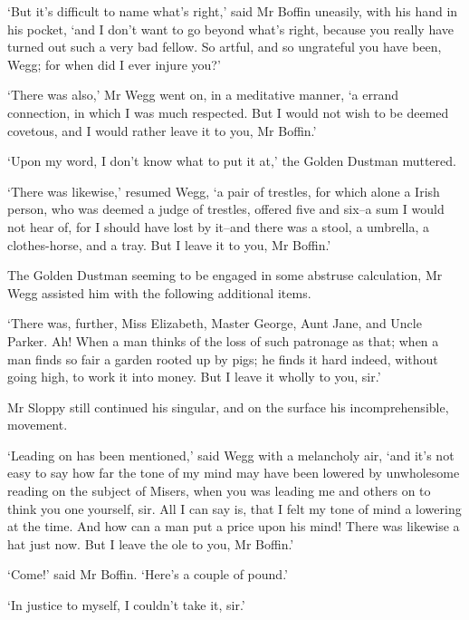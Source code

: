 ‘But it’s difficult to name what’s right,’ said Mr Boffin uneasily, with
his hand in his pocket, ‘and I don’t want to go beyond what’s right,
because you really have turned out such a very bad fellow. So artful,
and so ungrateful you have been, Wegg; for when did I ever injure you?’

‘There was also,’ Mr Wegg went on, in a meditative manner, ‘a errand
connection, in which I was much respected. But I would not wish to be
deemed covetous, and I would rather leave it to you, Mr Boffin.’

‘Upon my word, I don’t know what to put it at,’ the Golden Dustman
muttered.

‘There was likewise,’ resumed Wegg, ‘a pair of trestles, for which alone
a Irish person, who was deemed a judge of trestles, offered five and
six--a sum I would not hear of, for I should have lost by it--and there
was a stool, a umbrella, a clothes-horse, and a tray. But I leave it to
you, Mr Boffin.’

The Golden Dustman seeming to be engaged in some abstruse calculation,
Mr Wegg assisted him with the following additional items.

‘There was, further, Miss Elizabeth, Master George, Aunt Jane, and Uncle
Parker. Ah! When a man thinks of the loss of such patronage as that;
when a man finds so fair a garden rooted up by pigs; he finds it hard
indeed, without going high, to work it into money. But I leave it wholly
to you, sir.’

Mr Sloppy still continued his singular, and on the surface his
incomprehensible, movement.

‘Leading on has been mentioned,’ said Wegg with a melancholy air, ‘and
it’s not easy to say how far the tone of my mind may have been lowered
by unwholesome reading on the subject of Misers, when you was leading me
and others on to think you one yourself, sir. All I can say is, that
I felt my tone of mind a lowering at the time. And how can a man put a
price upon his mind! There was likewise a hat just now. But I leave the
ole to you, Mr Boffin.’

‘Come!’ said Mr Boffin. ‘Here’s a couple of pound.’

‘In justice to myself, I couldn’t take it, sir.’

